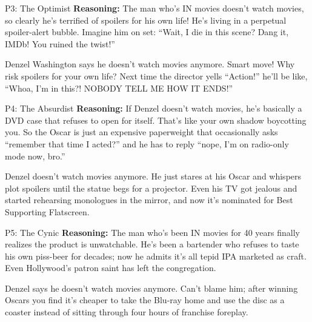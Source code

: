 \documentclass[11pt]{article}
\begin{document}
\vspace{0.9em}

\begin{personabox}[p3color]{P3: The Optimist}
\textbf{Reasoning:} The man who's IN movies doesn't watch movies, so clearly he's terrified of spoilers for his own life! He's living in a perpetual spoiler-alert bubble. Imagine him on set: ``Wait, I die in this scene? Dang it, IMDb! You ruined the twist!''
\end{personabox}
\vspace{-1.2em}
\begin{jokebox}
Denzel Washington says he doesn't watch movies anymore. Smart move! Why risk spoilers for your own life? Next time the director yells ``Action!'' he'll be like, ``Whoa, I'm in this?! NOBODY TELL ME HOW IT ENDS!''
\end{jokebox}



\begin{personabox}[p4color]{P4: The Absurdist}
\textbf{Reasoning:} If Denzel doesn't watch movies, he's basically a DVD case that refuses to open for itself. That's like your own shadow boycotting you. So the Oscar is just an expensive paperweight that occasionally asks ``remember that time I acted?'' and he has to reply ``nope, I'm on radio-only mode now, bro.''
\end{personabox}
\vspace{-1.2em}
\begin{jokebox}
Denzel doesn't watch movies anymore. He just stares at his Oscar and whispers plot spoilers until the statue begs for a projector. Even his TV got jealous and started rehearsing monologues in the mirror, and now it's nominated for Best Supporting Flatscreen.
\end{jokebox}

\vspace{0.9em}

\begin{personabox}[p5color]{P5: The Cynic}
\textbf{Reasoning:} The man who's been IN movies for 40 years finally realizes the product is unwatchable. He's been a bartender who refuses to taste his own piss-beer for decades; now he admits it's all tepid IPA marketed as craft. Even Hollywood's patron saint has left the congregation.
\end{personabox}
\vspace{-1.2em}
\begin{jokebox}
Denzel says he doesn't watch movies anymore. Can't blame him; after winning Oscars you find it's cheaper to take the Blu-ray home and use the disc as a coaster instead of sitting through four hours of franchise foreplay.
\end{jokebox}
\end{document}
